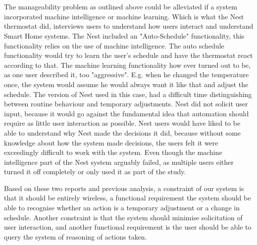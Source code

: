 \\\\
The manageability problem as outlined above could be alleviated if a system incorporated machine intelligence or machine learning. Which is what the Nest thermostat did, \cite{AdaptiveInterviews} interviews users to understand how users interact and understand Smart Home systems. The Nest included an "Auto-Schedule" functionality, this functionality relies on the use of machine intelligence. The auto schedule functionality would try to learn the user's schedule and have the thermostat react according to that. The machine learning functionality how ever turned out to be, as one user described it\cite{AdaptiveInterviews}, too "aggressive". E.g. when he changed the temperature once, the system would assume he would always want it like that and adjust the schedule. The version of Nest used in this case, had a difficult time distinguishing between routine behaviour and temporary adjustments. Nest did not solicit user input, because it would go against the fundamental idea that automation should require as little user interaction as possible. Nest users would have liked to be able to understand why Nest made the decisions it did, because without some knowledge about how the system made decisions, the users felt it were exceedingly difficult to work with the system.
Even though the machine intelligence part of the Nest system\cite{AdaptiveInterviews} arguably failed, as multiple users either turned it off completely or only used it as part of the study.

Based on these two reports and previous analysis, a constraint of our system is that it should be entirely wireless, a functional requirement the system should be able to recognise whether an action is a temporary adjustment or a change in schedule. Another constraint is that the system should minimise solicitation of user interaction, and another functional requirement is the user should be able to query the system of reasoning of actions taken.
\label{int:requirements}

